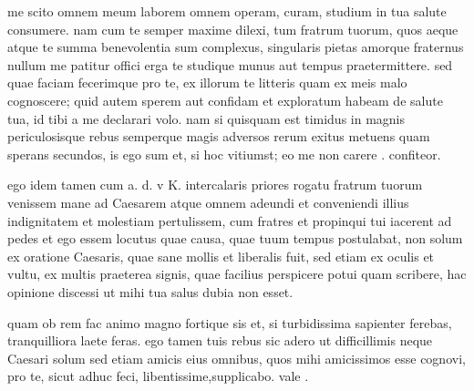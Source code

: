 


 me scito omnem meum laborem omnem operam, curam, studium in tua salute consumere. nam cum te semper maxime dilexi, tum fratrum tuorum, quos aeque atque te summa benevolentia sum complexus, singularis pietas amorque fraternus nullum me patitur offici erga te studique munus aut tempus praetermittere. sed quae faciam fecerimque pro te, ex illorum te litteris quam ex meis malo cognoscere; quid autem sperem aut confidam et exploratum habeam de salute tua, id tibi a me declarari volo. nam si quisquam est timidus in magnis periculosisque rebus semperque magis adversos rerum exitus metuens quam sperans secundos, is ego sum et, si hoc vitiumst; eo me non carere . confiteor.

 ego idem tamen cum a. d. v K. intercalaris priores rogatu fratrum tuorum venissem mane ad Caesarem atque omnem adeundi et conveniendi illius indignitatem et molestiam pertulissem, cum fratres et propinqui tui iacerent ad pedes et ego essem locutus quae causa, quae tuum tempus postulabat, non solum ex oratione Caesaris, quae sane mollis et liberalis fuit, sed etiam ex oculis et vultu, ex multis praeterea signis, quae facilius perspicere potui quam scribere, hac opinione discessi ut mihi tua salus dubia non esset.

 quam ob rem fac animo magno fortique sis et, si turbidissima sapienter ferebas, tranquilliora laete feras. ego tamen tuis rebus sic adero ut difficillimis neque Caesari solum sed etiam amicis eius omnibus, quos mihi amicissimos esse cognovi, pro te, sicut adhuc feci, libentissime,supplicabo. vale .
